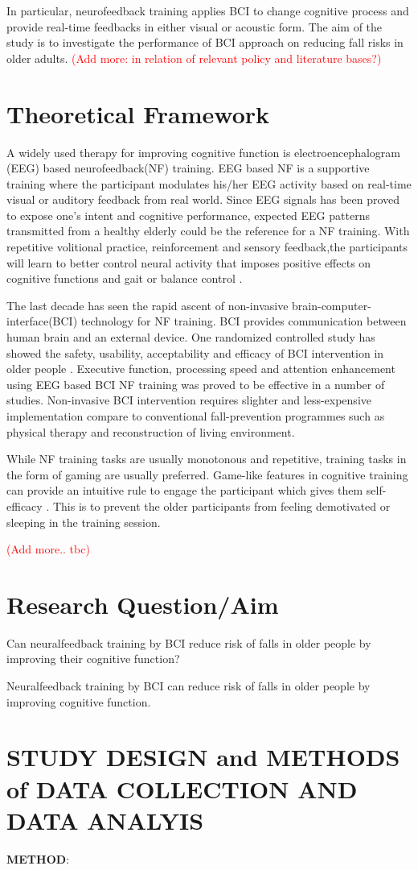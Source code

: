 \documentclass{article}
\begin{document}
In particular, neurofeedback training applies BCI to change cognitive process and provide real-time feedbacks in either visual or acoustic form. The aim of the study is to investigate the performance of BCI approach on reducing fall risks in older adults. \textcolor{red}{(Add more: in relation of relevant policy and literature bases?)}

\section{Theoretical Framework}
A widely used therapy for improving cognitive function is electroencephalogram (EEG) based neurofeedback(NF) training. EEG based NF is a supportive training where the participant modulates his/her EEG activity based on real-time visual or auditory feedback from real world. Since EEG signals has been proved to expose one's intent and cognitive performance, expected EEG patterns transmitted from a healthy elderly could be the reference for a NF training. With repetitive volitional practice, reinforcement and sensory feedback,the participants will learn to better control neural activity that imposes positive effects on cognitive functions and gait or balance control \cite{Miladinovic_2020}. 

The last decade has seen the rapid ascent of non-invasive brain-computer-interface(BCI) technology for NF training. BCI provides communication between human brain and an external device. One randomized controlled study has showed the safety, usability, acceptability and efficacy of BCI intervention in older people \cite{Lee_2013}. Executive function, processing speed \cite{Nouchi_2012} and attention \cite{Arvaneh_2019} enhancement using EEG based BCI NF training was proved to be effective in a number of studies. Non-invasive BCI intervention requires slighter and less-expensive implementation compare to conventional fall-prevention programmes such as physical therapy and reconstruction of living environment. 

While NF training tasks are usually monotonous and repetitive, training tasks in the form of gaming are usually preferred. Game-like features in cognitive training can provide an intuitive rule to engage the participant which gives them self-efficacy \cite{McGonigal_2011}. This is to prevent the older participants from feeling demotivated or sleeping in the training session. 

\textcolor{red}{(Add more.. tbc)}

\section{Research Question/Aim}
\begin{description}[font=$\bullet$~\normalfont\textbf]
\item [Research Question:] Can neuralfeedback training by BCI reduce risk of falls in older people by improving their cognitive function?
\item [Present hypothesis:] Neuralfeedback training by BCI can reduce risk of falls in older people by improving cognitive function. 
\end{description}


\section{STUDY DESIGN and METHODS of DATA COLLECTION AND DATA ANALYIS}
\textbf{METHOD}: 


\printbibliography
\end{document}
